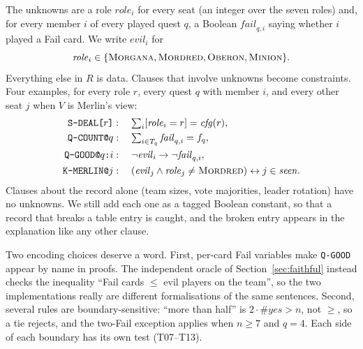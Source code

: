 \documentclass[runningheads]{llncs}
\newcommand{\cl}[1]{\texttt{#1}}
\newcommand{\evil}{\mathit{evil}}
\newcommand{\role}{\mathit{role}}
\newcommand{\fail}{\mathit{fail}}
\newcommand{\R}[1]{\textsc{#1}}            %
\begin{document}
The unknowns are a role $\role_i$ for every seat (an integer over the seven roles) and, for every member $i$ of
every played quest $q$, a Boolean $\fail_{q,i}$ saying whether $i$ played a Fail card. We write $\evil_i$ for
\[\role_i\in\{\R{Morgana},\R{Mordred},\R{Oberon},\R{Minion}\}.\]
Everything else in $R$ is data. Clauses that involve unknowns become constraints. Four examples, for every role $r$,
every quest $q$ with member $i$, and every other seat $j$ when $V$ is Merlin's view:
\begin{align*}
\cl{S-DEAL[$r$]}&:\quad \textstyle\sum_{i}[\role_i=r]=\mathit{cfg}(r),\\
\cl{Q-COUNT@}q&:\quad \textstyle\sum_{i\in T_q}\fail_{q,i}=f_q,\\
\cl{Q-GOOD@}q\cl{:}i&:\quad \neg\evil_i\rightarrow\neg\fail_{q,i},\\
\cl{K-MERLIN@}j&:\quad (\evil_j\wedge\role_j\ne\R{Mordred})\leftrightarrow j\in\mathit{seen}.
\end{align*}
Clauses about the record alone (team sizes, vote majorities, leader rotation) have no unknowns. We still add each one
as a tagged Boolean constant, so that a record that breaks a table entry is caught, and the broken entry appears in the
explanation like any other clause.

Two encoding choices deserve a word. First, per-card Fail variables make \cl{Q-GOOD} appear by name in proofs.
The independent oracle of Section~\ref{sec:faithful} instead checks the inequality ``Fail cards $\le$ evil players
on the team'', so the two implementations really are different formalisations of the same sentences. Second, several
rules are boundary-sensitive: ``more than half'' is $2\cdot\#\mathit{yes}>n$, not $\ge$, so a tie rejects, and the
two-Fail exception applies when $n\ge7$ and $q=4$. Each side of each boundary has its own test (T07--T13).
\end{document}
